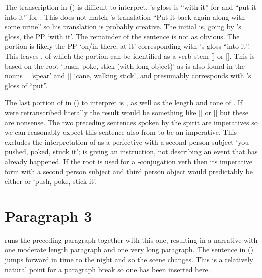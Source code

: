 The transcription in (\lastx) is difficult to interpret.
\citeauthor{swanton:1909}’s gloss is “with it” for  and “put it into it” for .
This does not match \citeauthor{swanton:1909}’s translation “Put it back again along with some urine” so his translation is probably creative.
The initial  is, going by \citeauthor{swanton:1909}’s gloss, the PP  ‘with it’.
The remainder of the sentence is not as obvious.
The  portion is likely the PP  ‘on/in there, at it’ corresponding with \citeauthor{swanton:1909}’s gloss “into it”.
This leaves , of which the  portion can be identified as a verb stem  [] or  [].
This is based on the root  ‘push, poke, stick (with long object)’ as is also found in the nouns  [] ‘spear’ and  [] ‘cane, walking stick’, and presumably corresponds with \citeauthor{swanton:1909}’s gloss of “put”.

The last portion of  in (\lastx) to interpret is , as well as the length and tone of .
If  were retranscribed literally the result would be something like  [] or  [] but these are nonsense.
The two preceding sentences spoken by the spirit  are imperatives so we can reasonably expect this sentence also from  to be an imperative.
This excludes the interpretation of  as a perfective with a second person subject  ‘you pushed, poked, stuck it’;  is giving an instruction, not describing an event that has already happened.
If the root  is used for a -conjugation verb then its imperative form with a second person subject and third person object would predictably be either  or  ‘push, poke, stick it’.

\section{Paragraph 3}\label{sec:093-para-3}

\citeauthor{swanton:1909} runs the preceding paragraph together with this one, resulting in a narrative with one  moderate length paragraph and one very long paragraph.
The sentence in (\nextx) jumps forward in time to the night and so the scene changes.
This is a relatively natural point for a paragraph break so one has been inserted here.

